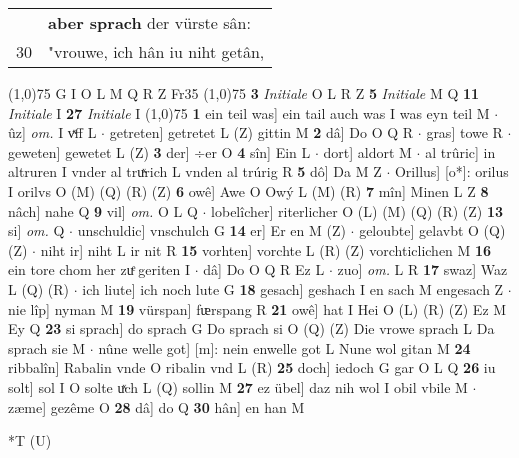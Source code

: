 \documentclass[8pt,a4paper,notitlepage]{article}
\begin{document}
\begin{table}[ht]
\begin{minipage}[t]{0.5\linewidth}
\begin{tabular}{rl}
 & \textbf{aber sprach} der vürste sân:\\ 
30 & "vrouwe, ich hân iu niht getân,\\ 
\end{tabular}
\scriptsize
\line(1,0){75} \newline
G I O L M Q R Z Fr35 \newline
\line(1,0){75} \newline
\textbf{3} \textit{Initiale} O L R Z  \textbf{5} \textit{Initiale} M Q  \textbf{11} \textit{Initiale} I  \textbf{27} \textit{Initiale} I  \newline
\line(1,0){75} \newline
\textbf{1} ein teil was] ein tail auch was I was eyn teil M  $\cdot$ ûz] \textit{om.} I vͯff L  $\cdot$ getreten] getretet L (Z) gittin M \textbf{2} dâ] Do O Q R  $\cdot$ gras] towe R  $\cdot$ geweten] gewetet L (Z) \textbf{3} der] ÷er O \textbf{4} sîn] Ein L  $\cdot$ dort] aldort M  $\cdot$ al trûric] in altruren I vnder al truͯrich L vnden al trúrig R \textbf{5} dô] Da M Z  $\cdot$ Orillus] [o*]: orilus I orilvs O (M) (Q) (R) (Z) \textbf{6} owê] Awe O Owý L (M) (R) \textbf{7} mîn] Minen L Z \textbf{8} nâch] nahe Q \textbf{9} vil] \textit{om.} O L Q  $\cdot$ lobelîcher] riterlicher O (L) (M) (Q) (R) (Z) \textbf{13} si] \textit{om.} Q  $\cdot$ unschuldic] vnschulch G \textbf{14} er] Er en M (Z)  $\cdot$ geloubte] gelavbt O (Q) (Z)  $\cdot$ niht ir] niht L ir nit R \textbf{15} vorhten] vorchte L (R) (Z) vorchticlichen M \textbf{16} ein tore chom her zuͤ geriten I  $\cdot$ dâ] Do O Q R Ez L  $\cdot$ zuo] \textit{om.} L R \textbf{17} swaz] Waz L (Q) (R)  $\cdot$ ich liute] ich noch lute G \textbf{18} gesach] geshach I en sach M engesach Z  $\cdot$ nie lîp] nyman M \textbf{19} vürspan] fᵫrspang R \textbf{21} owê] hat I Hei O (L) (R) (Z) Ez M Ey Q \textbf{23} si sprach] do sprach G Do sprach si O (Q) (Z) Die vrowe sprach L Da sprach sie M  $\cdot$ nûne welle got] [m]: nein enwelle got L Nune wol gitan M \textbf{24} ribbalîn] Rabalin vnde O ribalin vnd L (R) \textbf{25} doch] iedoch G gar O L Q \textbf{26} iu solt] sol I O solte uͯch L (Q) sollin M \textbf{27} ez übel] daz nih wol I obil vbile M  $\cdot$ zæme] gezême O \textbf{28} dâ] do Q \textbf{30} hân] en han M \newline
\end{minipage}
\hspace{0.5cm}
\begin{minipage}[t]{0.5\linewidth}
\small
\begin{center}*T (U)
\end{center}

\end{minipage}
\end{table}
\end{document}
